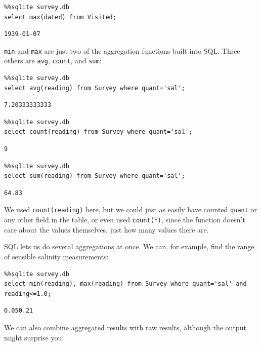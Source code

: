 \documentclass{book}
\begin{document}
\begin{verbatim}
%%sqlite survey.db
select max(dated) from Visited;
\end{verbatim}

\begin{verbatim}
1939-01-07
\end{verbatim}

\texttt{min} and \texttt{max} are just two of the aggregation functions
built into SQL. Three others are \texttt{avg}, \texttt{count}, and
\texttt{sum}:

\begin{verbatim}
%%sqlite survey.db
select avg(reading) from Survey where quant='sal';
\end{verbatim}

\begin{verbatim}
7.20333333333
\end{verbatim}

\begin{verbatim}
%%sqlite survey.db
select count(reading) from Survey where quant='sal';
\end{verbatim}

\begin{verbatim}
9
\end{verbatim}

\begin{verbatim}
%%sqlite survey.db
select sum(reading) from Survey where quant='sal';
\end{verbatim}

\begin{verbatim}
64.83
\end{verbatim}

We used \texttt{count(reading)} here, but we could just as easily have
counted \texttt{quant} or any other field in the table, or even used
\texttt{count(*)}, since the function doesn't care about the values
themselves, just how many values there are.

SQL lets us do several aggregations at once. We can, for example, find
the range of sensible salinity measurements:

\begin{verbatim}
%%sqlite survey.db
select min(reading), max(reading) from Survey where quant='sal' and reading<=1.0;
\end{verbatim}

\begin{verbatim}
0.050.21
\end{verbatim}

We can also combine aggregated results with raw results, although the
output might surprise you:
\end{document}
